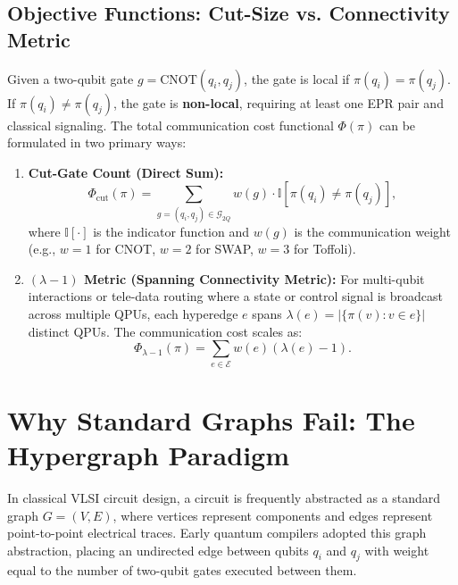 \subsection{Objective Functions: Cut-Size vs. Connectivity Metric}
Given a two-qubit gate $g = \text{CNOT}(q_i, q_j)$, the gate is local if $\pi(q_i) = \pi(q_j)$. If $\pi(q_i) \neq \pi(q_j)$, the gate is \textbf{non-local}, requiring at least one EPR pair and classical signaling. The total communication cost functional $\Phi(\pi)$ can be formulated in two primary ways:

\begin{enumerate}
    \item \textbf{Cut-Gate Count (Direct Sum):}
    \begin{equation}
        \Phi_{\text{cut}}(\pi) = \sum_{g = (q_i, q_j) \in \mathcal{G}_{2Q}} w(g) \cdot \mathbb{I}\left[\pi(q_i) \neq \pi(q_j)\right],
        \label{eq:cut_gate_count_ch5}
    \end{equation}
    where $\mathbb{I}[\cdot]$ is the indicator function and $w(g)$ is the communication weight (e.g., $w=1$ for CNOT, $w=2$ for SWAP, $w=3$ for Toffoli).
    
    \item \textbf{$(\lambda - 1)$ Metric (Spanning Connectivity Metric):} For multi-qubit interactions or tele-data routing where a state or control signal is broadcast across multiple QPUs, each hyperedge $e$ spans $\lambda(e) = |\{\pi(v) : v \in e\}|$ distinct QPUs. The communication cost scales as:
    \begin{equation}
        \Phi_{\lambda - 1}(\pi) = \sum_{e \in \mathcal{E}} w(e) \left( \lambda(e) - 1 \right).
        \label{eq:lambda_minus_one_ch5}
    \end{equation}
\end{enumerate}

\section{Why Standard Graphs Fail: The Hypergraph Paradigm}
\label{sec:graph_vs_hypergraph}

In classical VLSI circuit design, a circuit is frequently abstracted as a standard graph $G = (V, E)$, where vertices represent components and edges represent point-to-point electrical traces. Early quantum compilers adopted this graph abstraction, placing an undirected edge between qubits $q_i$ and $q_j$ with weight equal to the number of two-qubit gates executed between them.

